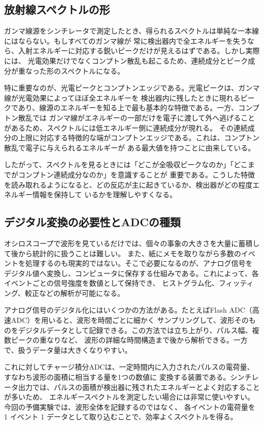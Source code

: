 \documentclass[uplatex,dvipdfmx,12pt,nomag]{jsarticle}
\begin{document}
\subsection{放射線スペクトルの形}

ガンマ線源をシンチレータで測定したとき、得られるスペクトルは単純な一本線にはならない。もしすべてのガンマ線が
常に検出器内で全エネルギーを失うなら、入射エネルギーに対応する鋭いピークだけが見えるはずである。しかし実際には、
光電効果だけでなくコンプトン散乱も起こるため、連続成分とピーク成分が重なった形のスペクトルになる。

特に重要なのが、光電ピークとコンプトンエッジである。光電ピークは、ガンマ線が光電効果によってほぼ全エネルギーを
検出器内に残したときに現れるピークであり、線源のエネルギーを知る上で最も基本的な特徴である。一方、コンプトン散乱では
ガンマ線がエネルギーの一部だけを電子に渡して外へ逃げることがあるため、スペクトルには低エネルギー側に連続成分が現れる。
その連続成分の上限に対応する特徴的な端がコンプトンエッジである。これは、コンプトン散乱で電子に与えられるエネルギーが
ある最大値を持つことに由来している。

したがって、スペクトルを見るときには「どこが全吸収ピークなのか」「どこまでがコンプトン連続成分なのか」を意識することが
重要である。こうした特徴を読み取れるようになると、どの反応が主に起きているか、検出器がどの程度エネルギー情報を保持して
いるかを理解しやすくなる。

\subsection{デジタル変換の必要性とADCの種類}

オシロスコープで波形を見ているだけでは、個々の事象の大きさを大量に蓄積して後から統計的に扱うことは難しい。
また、紙にメモを取りながら多数のイベントを処理するのも現実的ではない。そこで必要になるのが、アナログ信号を
デジタル値へ変換し、コンピュータに保存する仕組みである。これによって、各イベントごとの信号強度を数値として保持でき、
ヒストグラム化、フィッティング、較正などの解析が可能になる。

アナログ信号のデジタル化にはいくつかの方法がある。たとえばFlash ADC（高速ADC）を用いると、波形を時間ごとに細かく
サンプリングして、波形そのものをデジタルデータとして記録できる。この方法では立ち上がり、パルス幅、複数ピークの重なりなど、
波形の詳細な時間構造まで後から解析できる。一方で、扱うデータ量は大きくなりやすい。

これに対してチャージ積分ADCは、一定時間内に入力されたパルスの電荷量、すなわち波形の面積に相当する量を1つの数値に
変換する装置である。シンチレータ出力では、パルスの面積が検出器に残されたエネルギーとよく対応することが多いため、
エネルギースペクトルを測定したい場合には非常に使いやすい。今回の予備実験では、波形全体を記録するのではなく、
各イベントの電荷量を 1 イベント 1 データとして取り込むことで、効率よくスペクトルを得る。
\end{document}
